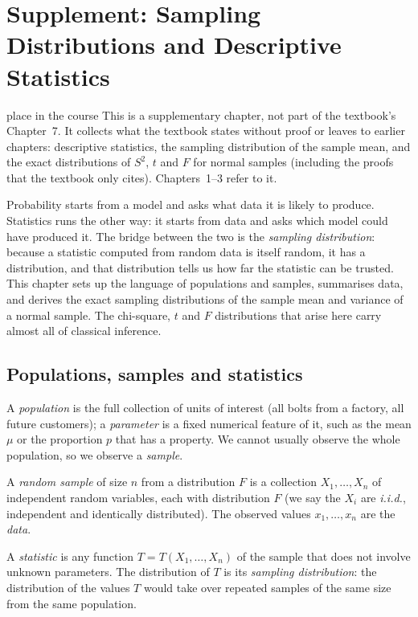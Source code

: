 \chapter{Supplement: Sampling Distributions and Descriptive Statistics}

\begin{nuance}{place in the course}
This is a supplementary chapter, not part of the textbook's Chapter~7. It collects what the textbook states without proof or leaves to earlier chapters: descriptive statistics, the sampling distribution of the sample mean, and the exact distributions of $S^2$, $t$ and $F$ for normal samples (including the proofs that the textbook only cites). Chapters~1--3 refer to it.
\end{nuance}

Probability starts from a model and asks what data it is likely to produce. Statistics runs the other way: it starts from data and asks which model could have produced it. The bridge between the two is the \emph{sampling distribution}: because a statistic computed from random data is itself random, it has a distribution, and that distribution tells us how far the statistic can be trusted. This chapter sets up the language of populations and samples, summarises data, and derives the exact sampling distributions of the sample mean and variance of a normal sample. The chi-square, $t$ and $F$ distributions that arise here carry almost all of classical inference.

\section{Populations, samples and statistics}

A \emph{population} is the full collection of units of interest (all bolts from a factory, all future customers); a \emph{parameter} is a fixed numerical feature of it, such as the mean $\mu$ or the proportion $p$ that has a property. We cannot usually observe the whole population, so we observe a \emph{sample}.

\begin{definition}
A \emph{random sample} of size $n$ from a distribution $F$ is a collection $X_1,\dots,X_n$ of independent random variables, each with distribution $F$ (we say the $X_i$ are \emph{i.i.d.}, independent and identically distributed). The observed values $x_1,\dots,x_n$ are the \emph{data}.
\end{definition}

\begin{definition}
A \emph{statistic} is any function $T=T(X_1,\dots,X_n)$ of the sample that does not involve unknown parameters. The distribution of $T$ is its \emph{sampling distribution}: the distribution of the values $T$ would take over repeated samples of the same size from the same population.
\end{definition}

